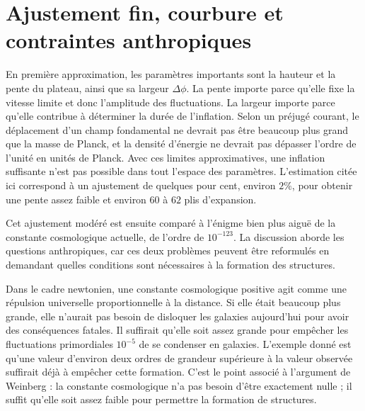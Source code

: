 \section{Ajustement fin, courbure et contraintes anthropiques}

En première approximation, les paramètres importants sont la hauteur et la pente du plateau, ainsi que sa largeur \(\Delta\phi\). La pente importe parce qu’elle fixe la vitesse limite et donc l’amplitude des fluctuations. La largeur importe parce qu’elle contribue à déterminer la durée de l’inflation. Selon un préjugé courant, le déplacement d’un champ fondamental ne devrait pas être beaucoup plus grand que la masse de Planck, et la densité d’énergie ne devrait pas dépasser l’ordre de l’unité en unités de Planck. Avec ces limites approximatives, une inflation suffisante n’est pas possible dans tout l’espace des paramètres. L’estimation citée ici correspond à un ajustement de quelques pour cent, environ \(2\%\), pour obtenir une pente assez faible et environ \(60\) à \(62\) plis d’expansion.

\begin{classroomqa}
\end{classroomqa}

Cet ajustement modéré est ensuite comparé à l’énigme bien plus aiguë de la constante cosmologique actuelle, de l’ordre de \(10^{-123}\). La discussion aborde les questions anthropiques, car ces deux problèmes peuvent être reformulés en demandant quelles conditions sont nécessaires à la formation des structures.

Dans le cadre newtonien, une constante cosmologique positive agit comme une répulsion universelle proportionnelle à la distance. Si elle était beaucoup plus grande, elle n’aurait pas besoin de disloquer les galaxies aujourd’hui pour avoir des conséquences fatales. Il suffirait qu’elle soit assez grande pour empêcher les fluctuations primordiales \(10^{-5}\) de se condenser en galaxies. L’exemple donné est qu’une valeur d’environ deux ordres de grandeur supérieure à la valeur observée suffirait déjà à empêcher cette formation. C’est le point associé à l’argument de Weinberg : la constante cosmologique n’a pas besoin d’être exactement nulle ; il suffit qu’elle soit assez faible pour permettre la formation de structures.

